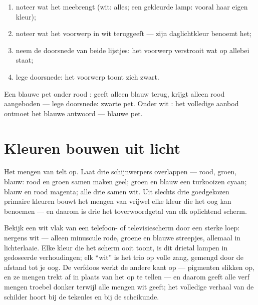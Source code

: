 \begin{method}\label{met:g8:colors-spectra:predict}
\begin{enumerate}
  \item noteer wat het  meebrengt (wit: alles; een gekleurde
        lamp: vooral haar eigen kleur);
  \item noteer wat het voorwerp in wit  teruggeeft --- zijn
        daglichtkleur benoemt het;
  \item neem de doorsnede van beide lijstjes: het voorwerp verstrooit
        wat op allebei staat;
  \item lege doorsnede: het voorwerp toont zich zwart.
\end{enumerate}
Een blauwe pet onder rood : geeft alleen blauw terug, krijgt
alleen rood aangeboden --- lege doorsnede: zwarte pet. Onder wit
: het volledige aanbod ontmoet het blauwe antwoord ---
blauwe pet.
\end{method}

\section{Kleuren bouwen uit licht}

\begin{example}\label{ex:g8:colors-spectra:additive}
Het mengen van \emph{} telt op. Laat drie schijnwerpers
overlappen --- rood, groen, blauw: rood en groen samen maken geel;
groen en blauw een turkooizen cyaan; blauw en rood magenta; alle drie
samen wit. Uit slechts drie goedgekozen primaire kleuren bouwt het
mengen van  vrijwel elke kleur die het oog kan benoemen --- en
daarom is drie het toverwoordgetal van elk oplichtend scherm.
\end{example}

\begin{example}\label{ex:g8:colors-spectra:screen}
Bekijk een wit vlak van een telefoon- of televisiescherm door een
sterke loep: nergens wit --- alleen minuscule rode, groene en blauwe
streepjes, allemaal in lichterlaaie. Elke kleur die het scherm ooit
toont, is dit drietal lampen in gedoseerde verhoudingen; elk ``wit'' is
het trio op volle zang, gemengd door de afstand tot je oog. De verfdoos
werkt de andere kant op --- pigmenten slikken op, en ze mengen trekt
 af in plaats van het op te tellen --- en daarom geeft
alle verf mengen troebel donker terwijl alle  mengen wit
geeft; het volledige verhaal van de schilder hoort bij de tekenles en
bij de scheikunde.
\end{example}

